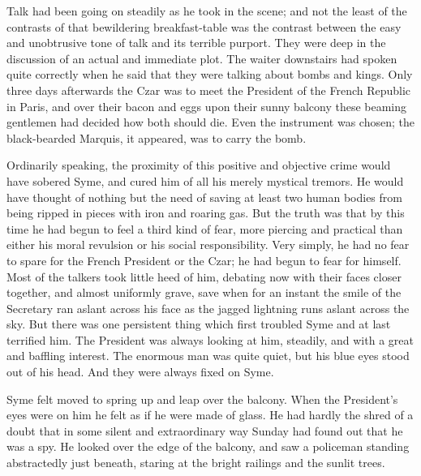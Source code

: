 \documentclass{book}
\begin{document}
Talk had been going on steadily as he took in the scene; and not the least of the contrasts of that bewildering breakfast-table was the contrast between the easy and unobtrusive tone of talk and its terrible purport. They were deep in the discussion of an actual and immediate plot. The waiter downstairs had spoken quite correctly when he said that they were talking about bombs and kings. Only three days afterwards the Czar was to meet the President of the French Republic in Paris, and over their bacon and eggs upon their sunny balcony these beaming gentlemen had decided how both should die. Even the instrument was chosen; the black-bearded Marquis, it appeared, was to carry the bomb.

Ordinarily speaking, the proximity of this positive and objective crime would have sobered Syme, and cured him of all his merely mystical tremors. He would have thought of nothing but the need of saving at least two human bodies from being ripped in pieces with iron and roaring gas. But the truth was that by this time he had begun to feel a third kind of fear, more piercing and practical than either his moral revulsion or his social responsibility. Very simply, he had no fear to spare for the French President or the Czar; he had begun to fear for himself. Most of the talkers took little heed of him, debating now with their faces closer together, and almost uniformly grave, save when for an instant the smile of the Secretary ran aslant across his face as the jagged lightning runs aslant across the sky. But there was one persistent thing which first troubled Syme and at last terrified him. The President was always looking at him, steadily, and with a great and baffling interest. The enormous man was quite quiet, but his blue eyes stood out of his head. And they were always fixed on Syme.

Syme felt moved to spring up and leap over the balcony. When the President’s eyes were on him he felt as if he were made of glass. He had hardly the shred of a doubt that in some silent and extraordinary way Sunday had found out that he was a spy. He looked over the edge of the balcony, and saw a policeman standing abstractedly just beneath, staring at the bright railings and the sunlit trees.
\end{document}
